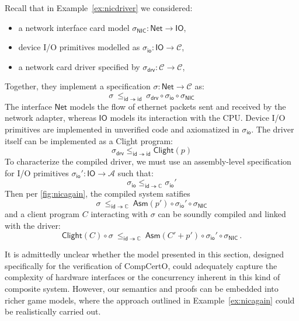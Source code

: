 \documentclass[sigplan,10pt,review]{acmart}
\newcommand{\kw}[1]{\ensuremath{ \mathsf{#1} }}
\begin{document}
\begin{example} \label{ex:nicagain} %
  Recall that in Example~\ref{ex:nicdriver}
  we considered:
  \begin{itemize}
  \item a network interface card model
  $\sigma_\kw{NIC} : \kw{Net} \rightarrow \kw{IO}$,
  \item device I/O primitives modelled as
  $\sigma_\kw{io} : \kw{IO} \rightarrow \mathcal{C}$,
  \item a network card driver specified by
  $\sigma_\kw{drv} : \mathcal{C} \rightarrow \mathcal{C}$,
  \end{itemize}
  Together, they implement a specification
  $\sigma : \kw{Net} \rightarrow \mathcal{C}$ as:
  \begin{equation} \label{eqn:nicspec}
    \sigma
    \: \le_{\kw{id} \twoheadrightarrow \kw{id}} \:
    \sigma_\kw{drv} \circ \sigma_\kw{io} \circ \sigma_\kw{NIC}
  \end{equation}
  The interface $\kw{Net}$ models the flow of ethernet packets
  sent and received by the network adapter,
  whereas $\kw{IO}$ models its interaction with the CPU.
  Device I/O primitives are implemented in unverified code
  and axiomatized in $\sigma_\kw{io}$.
  The driver itself can be implemented as a Clight program:
  \begin{equation} \label{eqn:drvcorrect}
    \sigma_\kw{drv}
    \le_{\kw{id} \twoheadrightarrow \kw{id}}
    \kw{Clight}(p)
  \end{equation}
  To characterize the compiled driver,
  we must use an assembly-level specification for I/O primitives
  $\sigma_\kw{io}' : \kw{IO} \rightarrow \mathcal{A}$
  such that:
  \begin{equation} \label{eqn:iocompat}
    \sigma_\kw{io}
    \le_{\kw{id} \twoheadrightarrow \mathbb{C}}
    \sigma_\kw{io}'
  \end{equation}
  Then per \autoref{fig:nicagain},
  the compiled system satifies
  \[
    \sigma
    \: \le_{\kw{id} \twoheadrightarrow \mathbb{C}} \:
    \kw{Asm}(p') \circ \sigma_\kw{io}' \circ \sigma_\kw{NIC}
  \]
  and a client program $C$ interacting with $\sigma$
  can be soundly compiled and linked with the driver:
  \[
    \kw{Clight}(C) \circ \sigma
    \: \le_{\kw{id} \twoheadrightarrow \mathbb{C}} \:
    \kw{Asm}(C' + p') \circ \sigma_\kw{io}' \circ \sigma_\kw{NIC}
    \,.
  \]
\end{example}

It is admittedly unclear whether
the model presented in this section,
designed specifically for the verification of CompCertO,
could adequately capture
the complexity of hardware interfaces
or the concurrency inherent in this kind of composite system.
However,
our semantics and proofs
can be embedded into richer game models,
where the approach outlined in Example~\ref{ex:nicagain}
could be realistically carried out.
\end{document}
